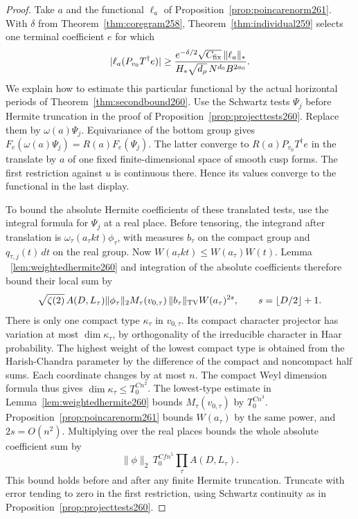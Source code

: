 \documentclass[a4paper,11pt]{article}
\theoremstyle{definition}
\theoremstyle{remark}
\numberwithin{equation}{section}
\begin{document}
\begin{proof}
Take \(a\) and the functional \(\ell_a\) of
Proposition~\ref{prop:poincarenorm261}. With \(\delta\) from
Theorem~\ref{thm:coregram258}, Theorem~\ref{thm:individual259}
selects one terminal coefficient \(e\) for which
\[
 |\ell_a(P_{v_0}T^\dagger e)|\ge
 \frac{e^{-\delta/2}\sqrt{C_{\rm fix}}\,\|\ell_a\|_*}
           {H_*\sqrt{d_\rho}\,N^{d_0} B^{2a_0}} .
\]
We explain how to estimate this particular functional by the
actual horizontal periods of Theorem~\ref{thm:secondbound260}.
Use the Schwartz tests \(\Psi_j\) before Hermite truncation in
the proof of Proposition~\ref{prop:projecttests260}. Replace
them by \(\omega(a)\Psi_j\). Equivariance of the bottom group
gives \(F_e(\omega(a)\Psi_j)=R(a)F_e(\Psi_j)\). The latter
converge to \(R(a)P_{v_0}T^\dagger e\) in the translate by
\(a\) of one fixed finite-dimensional space of smooth cusp
forms. The first restriction against \(u\) is continuous
there. Hence its values converge to the functional in the
last display.

To bound the absolute Hermite coefficients of these translated
tests, use the integral formula for \(\Psi_j\) at a real place.
Before tensoring, the integrand after translation is
\(\omega_\tau(a_\tau k t)\phi_\tau\), with measures \(b_\tau\)
on the compact group and \(q_{\tau,j}(t)\,dt\) on the real
group. Now \(W(a_\tau k t)\le W(a_\tau)W(t)\). Lemma
~\ref{lem:weightedhermite260} and integration of the absolute
coefficients therefore bound their local sum by
\[
 \sqrt{\zeta(2)}\,A(D,L_\tau)\|\phi_\tau\|_2
        M_\tau(v_{0,\tau})\,\|b_\tau\|_{\rm TV} W(a_\tau)^{2s},
 \qquad s=\lfloor D/2\rfloor+1 .
\]
There is only one compact type \(\kappa_\tau\) in \(v_{0,\tau}\).
Its compact character projector has variation at most
\(\dim\kappa_\tau\), by orthogonality of the irreducible
character in Haar probability. The highest weight of the
lowest compact type is obtained from the Harish-Chandra
parameter by the difference of the compact and noncompact
half sums. Each coordinate changes by at most \(n\).
The compact Weyl dimension formula thus gives
\(\dim\kappa_\tau\le T_0^{C n^2}\). The lowest-type estimate
in Lemma~\ref{lem:weightedhermite260} bounds \(M_\tau(v_{0,\tau})\)
by \(T_0^{C n^3}\). Proposition~\ref{prop:poincarenorm261}
bounds \(W(a_\tau)\) by the same power, and \(2s=O(n^2)\).
Multiplying over the real places bounds the whole absolute
coefficient sum by
\[
             \|\phi\|_2\,T_0^{C f n^5}\prod_\tau A(D,L_\tau).
\]
This bound holds before and after any finite Hermite truncation.
Truncate with error tending to zero in the first restriction,
using Schwartz continuity as in
Proposition~\ref{prop:projecttests260}.


\end{proof}
\end{document}
